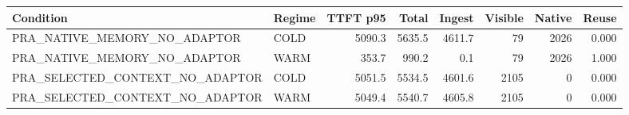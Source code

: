 \begin{tabular}{llrrrrrr}
\toprule
Condition & Regime & TTFT p95 & Total & Ingest & Visible & Native & Reuse \\
\midrule
PRA\_NATIVE\_MEMORY\_NO\_ADAPTOR & COLD & 5090.3 & 5635.5 & 4611.7 & 79 & 2026 & 0.000 \\
PRA\_NATIVE\_MEMORY\_NO\_ADAPTOR & WARM & 353.7 & 990.2 & 0.1 & 79 & 2026 & 1.000 \\
PRA\_SELECTED\_CONTEXT\_NO\_ADAPTOR & COLD & 5051.5 & 5534.5 & 4601.6 & 2105 & 0 & 0.000 \\
PRA\_SELECTED\_CONTEXT\_NO\_ADAPTOR & WARM & 5049.4 & 5540.7 & 4605.8 & 2105 & 0 & 0.000 \\
\bottomrule
\end{tabular}
